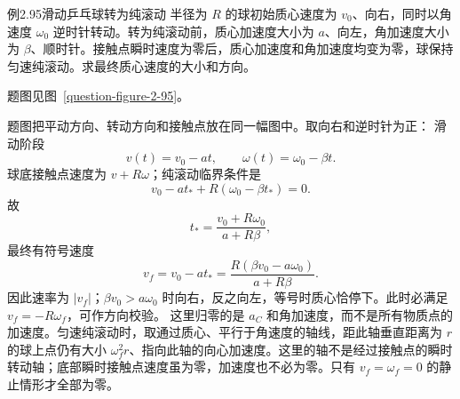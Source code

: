 \KinematicKeepSpace{10cm}
\begin{origexamplebox}{例2.95\quad 滑动乒乓球转为纯滚动}
半径为 $R$ 的球初始质心速度为 $v_0$、向右，同时以角速度 $\omega_0$ 逆时针转动。转为纯滚动前，质心加速度大小为 $a$、向左，角加速度大小为 $\beta$、顺时针。接触点瞬时速度为零后，质心加速度和角加速度均变为零，球保持匀速纯滚动。求最终质心速度的大小和方向。
\par 题图见图~\ref{question-figure-2-95}。
\KQuestionDR
\end{origexamplebox}
\begin{xesolution}
题图把平动方向、转动方向和接触点放在同一幅图中。取向右和逆时针为正：
\RollingBallDiagram
滑动阶段
\[
v(t)=v_0-at,\qquad \omega(t)=\omega_0-\beta t.
\]
球底接触点速度为 $v+R\omega$；纯滚动临界条件是
\[
v_0-at_*+R(\omega_0-\beta t_*)=0.
\]
故
\[
t_*=\frac{v_0+R\omega_0}{a+R\beta},
\]
最终有符号速度
\[
\boxed{v_f=v_0-at_*
=\frac{R(\beta v_0-a\omega_0)}{a+R\beta}}.
\]
因此速率为 $|v_f|$；$\beta v_0>a\omega_0$ 时向右，反之向左，等号时质心恰停下。此时必满足 $v_f=-R\omega_f$，可作方向校验。
这里归零的是 $a_C$ 和角加速度，而不是所有物质点的加速度。匀速纯滚动时，取通过质心、平行于角速度的轴线，距此轴垂直距离为 $r$ 的球上点仍有大小 $\omega_f^2r$、指向此轴的向心加速度。这里的轴不是经过接触点的瞬时转动轴；底部瞬时接触点速度虽为零，加速度也不必为零。只有 $v_f=\omega_f=0$ 的静止情形才全部为零。
\end{xesolution}

